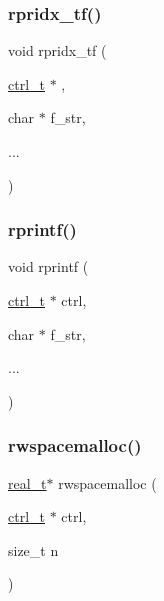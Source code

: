 \subsubsection{\texorpdfstring{rpridx\+\_\+tf()}{rpridx\_tf()}}
{\footnotesize\ttfamily void rpridx\+\_\+tf (\begin{DoxyParamCaption}\item[{\hyperlink{a00742}{ctrl\+\_\+t} $\ast$}]{,  }\item[{char $\ast$}]{f\+\_\+str,  }\item[{}]{... }\end{DoxyParamCaption})}

\mbox{\label{a00951_af0e0a700a8e7d63ed242d2b0c1944e2a}} 
\subsubsection{\texorpdfstring{rprintf()}{rprintf()}}
{\footnotesize\ttfamily void rprintf (\begin{DoxyParamCaption}\item[{\hyperlink{a00742}{ctrl\+\_\+t} $\ast$}]{ctrl,  }\item[{char $\ast$}]{f\+\_\+str,  }\item[{}]{... }\end{DoxyParamCaption})}

\mbox{\label{a00951_ad1c3f444b6873f0bfdb82e1bb98372d5}} 
\subsubsection{\texorpdfstring{rwspacemalloc()}{rwspacemalloc()}}
{\footnotesize\ttfamily \hyperlink{a00876_a1924a4f6907cc3833213aba1f07fcbe9}{real\+\_\+t}$\ast$ rwspacemalloc (\begin{DoxyParamCaption}\item[{\hyperlink{a00742}{ctrl\+\_\+t} $\ast$}]{ctrl,  }\item[{size\+\_\+t}]{n }\end{DoxyParamCaption})}

